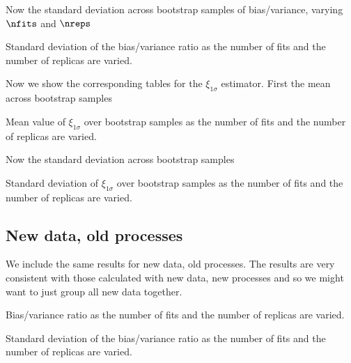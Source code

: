\FloatBarrier

Now the standard deviation across bootstrap samples of bias/variance, varying
$\nfits$ and $\nreps$
%
\begin{table}[h!]
    \label{tab:fullout_finite_effects_ratio_error}
    
    \caption{Standard deviation of the bias/variance ratio as the number of fits and the number of replicas are varied.}
\end{table}

\FloatBarrier

Now we show the corresponding tables for the $\xi_{1\sigma}$ estimator. First
the mean across bootstrap samples

\begin{table}[h!]
    \label{tab:fullout_finite_effects_xi_mean}
    
    \caption{Mean value of $\xi_{1\sigma}$ over bootstrap samples as the number of fits and the number of replicas are varied.}
\end{table}

\FloatBarrier

Now the standard deviation across bootstrap samples

\begin{table}[h!]
    \label{tab:fullout_finite_effects_xi_error}
    
    \caption{Standard deviation of $\xi_{1\sigma}$ over bootstrap samples as the number of fits and the number of replicas are varied.}
\end{table}

\FloatBarrier

\subsection{New data, old processes}

We include the same results for new data, old processes. The results are very
consistent with those calculated with new data, new processes and so we might
want to just group all new data together.

\begin{table}[h!]
    \label{tab:partialout_finite_effects_ratio_mean}
    
    \caption{Bias/variance ratio as the number of fits and the number of replicas are varied. }
\end{table}

\begin{table}[h!]
    \label{tab:partialout_finite_effects_ratio_error}
    
    \caption{Standard deviation of the bias/variance ratio as the number of fits and the number of replicas are varied. }
\end{table}


